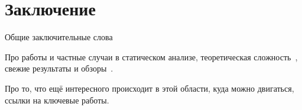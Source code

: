\chapter{Заключение}

Общие заключительные слова

Про работы и частные случаи в статическом анализе, теоретическая сложность~\cite{10.1145/3571252, istomina2023finegrained}, свежие результаты и обзоры~\cite{10.1145/3583660.3583664}.

Про то, что ещё интересного происходит в этой области, куда можно двигаться, ссылки на ключевые работы.
